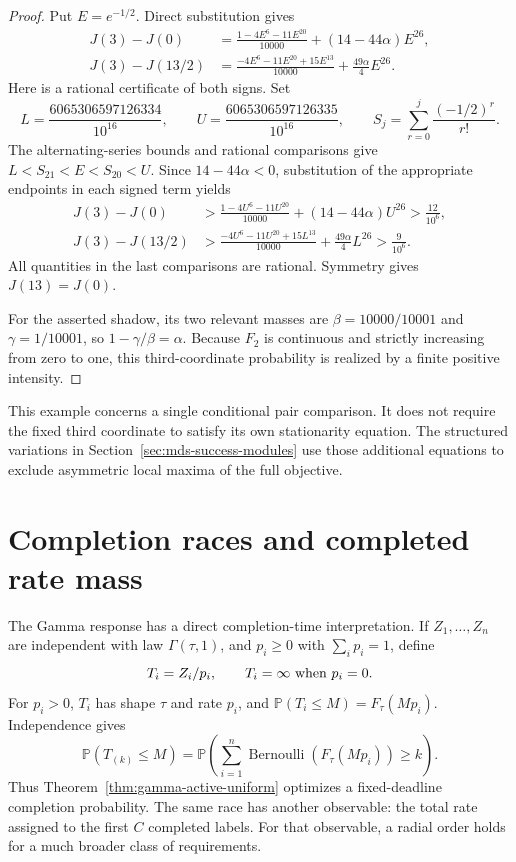 \documentclass[11pt]{article}
\theoremstyle{definition}
\theoremstyle{remark}
\DeclareMathOperator{\Bernoulli}{Bernoulli}
\newcommand{\Pbb}{\mathbb P}
\newcommand{\1}{\mathbf 1}
\begin{document}
\begin{proof}
Put \(E=e^{-1/2}\).  Direct substitution gives
\begin{align*}
  J(3)-J(0)
  &=\frac{1-4E^6-11E^{20}}{10000}
    +(14-44\alpha)E^{26},\\
  J(3)-J(13/2)
  &=\frac{-4E^6-11E^{20}+15E^{13}}{10000}
    +\frac{49\alpha}{4}E^{26}.
\end{align*}
Here is a rational certificate of both signs.  Set
\[
  L=\frac{6065306597126334}{10^{16}},\qquad
  U=\frac{6065306597126335}{10^{16}},\qquad
  S_j=\sum_{r=0}^j\frac{(-1/2)^r}{r!}.
\]
The alternating-series bounds and rational comparisons give
\(L<S_{21}<E<S_{20}<U\).  Since \(14-44\alpha<0\), substitution
of the appropriate endpoints in each signed term yields
\begin{align*}
  J(3)-J(0)
  &>\frac{1-4U^6-11U^{20}}{10000}
      +(14-44\alpha)U^{26}
    >\frac{12}{10^6},\\
  J(3)-J(13/2)
  &>\frac{-4U^6-11U^{20}+15L^{13}}{10000}
      +\frac{49\alpha}{4}L^{26}
    >\frac9{10^6}.
\end{align*}
All quantities in the last comparisons are rational.  Symmetry gives
\(J(13)=J(0)\).

For the asserted shadow, its two relevant masses are
\(\beta=10000/10001\) and \(\gamma=1/10001\), so
\(1-\gamma/\beta=\alpha\).  Because \(F_2\) is continuous and
strictly increasing from zero to one, this third-coordinate
probability is realized by a finite positive intensity.
\end{proof}

This example concerns a single conditional pair comparison.  It does
not require the fixed third coordinate to satisfy its own
stationarity equation.  The structured variations in
Section~\ref{sec:mds-success-modules} use those additional equations
to exclude asymmetric local maxima of the full objective.

\section{Completion races and completed rate mass}
\label{sec:completion-races}

The Gamma response has a direct completion-time interpretation.  If
\(Z_1,\ldots,Z_n\) are independent with law \(\Gamma(\tau,1)\), and
\(p_i\ge0\) with \(\sum_i p_i=1\), define
\[
  T_i=Z_i/p_i,
  \qquad T_i=\infty\ \hbox{when }p_i=0.
\]
For \(p_i>0\), \(T_i\) has shape \(\tau\) and rate \(p_i\), and
\(\Pbb(T_i\le M)=F_\tau(Mp_i)\).  Independence gives
\begin{equation}\label{eq:gamma-race-deadline}
  \Pbb(T_{(k)}\le M)
  =\Pbb\left(\sum_{i=1}^n
       \Bernoulli(F_\tau(Mp_i))\ge k\right).
\end{equation}
Thus Theorem~\ref{thm:gamma-active-uniform} optimizes a fixed-deadline
completion probability.  The same race has another observable: the
total rate assigned to the first \(C\) completed labels.  For that
observable, a radial order holds for a much broader class of
requirements.
\end{document}
